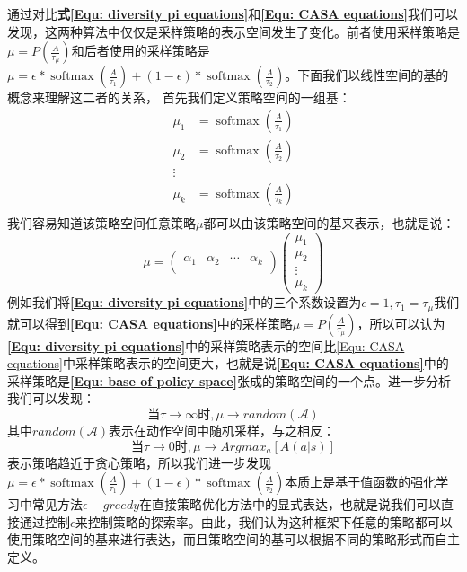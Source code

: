 通过对比\textbf{式\eqref{Equ: diversity pi equations}}和\textbf{\eqref{Equ: CASA equations}}我们可以发现，这两种算法中仅仅是采样策略的表示空间发生了变化。前者使用采样策略是$\mu=P(\frac{A}{\tau_\mu})$和后者使用的采样策略是$\mu=\epsilon * \operatorname{softmax}\left(\frac{A}{\tau_{1}}\right)+(1-\epsilon) * \operatorname{softmax}\left(\frac{A}{\tau_{2}}\right)$。下面我们以线性空间的基的概念来理解这二者的关系，
首先我们定义策略空间的一组基：
\begin{equation}
\label{Equ: base of policy space}
    \begin{aligned}
    \mu_1 &= \operatorname{softmax}\left(\frac{A}{\tau_{1}}\right)\\
    \mu_2 &= \operatorname{softmax}\left(\frac{A}{\tau_{2}}\right)\\
    \vdots \\
    \mu_k &= \operatorname{softmax}\left(\frac{A}{\tau_{k}}\right)\\
    \end{aligned}
\end{equation}
我们容易知道该策略空间任意策略$\mu$都可以由该策略空间的基来表示，也就是说：
\begin{equation}
    \mu =\left(\begin{array}{cccc}
\alpha_{1} & \alpha_{2} & \cdots & \alpha_{k} \\
\end{array}\right)\left(\begin{array}{c}
\mu_{1} \\
\mu_{2} \\
\vdots \\
\mu_{k}
\end{array}\right)
\end{equation}
例如我们将\textbf{\eqref{Equ: diversity pi equations}}中的三个系数设置为$\epsilon=1,\tau_1=\tau_\mu$我们就可以得到\textbf{\eqref{Equ: CASA equations}}中的采样策略$\mu=P(\frac{A}{\tau_\mu})$，所以可以认为\textbf{\eqref{Equ: diversity pi equations}}中的采样策略表示的空间比\eqref{Equ: CASA equations}中采样策略表示的空间更大，也就是说\textbf{\eqref{Equ: CASA equations}}中的采样策略是\textbf{\eqref{Equ: base of policy space}}张成的策略空间的一个点。进一步分析我们可以发现：
\begin{equation}
    \text{当} \tau \to \infty \text{时}, \mu \to random(\mathcal{A}) 
\end{equation}
其中$random(\mathcal{A})$表示在动作空间中随机采样，与之相反：
\begin{equation}
    \text{当} \tau \to 0 \text{时}, \mu \to Argmax_{a}[A(a|s)] 
\end{equation}
表示策略趋近于贪心策略，所以我们进一步发现$\mu=\epsilon * \operatorname{softmax}\left(\frac{A}{\tau_{1}}\right)+(1-\epsilon) * \operatorname{softmax}\left(\frac{A}{\tau_{2}}\right)$本质上是基于值函数的强化学习中常见方法$\epsilon-greedy$在直接策略优化方法中的显式表达，也就是说我们可以直接通过控制$\epsilon$来控制策略的探索率。由此，我们认为这种框架下任意的策略都可以使用策略空间的基来进行表达，而且策略空间的基可以根据不同的策略形式而自主定义。

